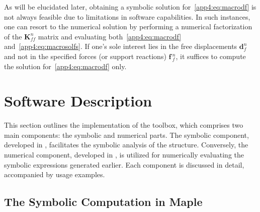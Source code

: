 %
As will be elucidated later, obtaining a symbolic solution for~\eqref{app4:eq:macrodf} is not always feasible due to limitations in software capabilities. In such instances, one can resort to the numerical solution by performing a numerical factorization of the $\mathbf{K}^{n}_{ff}$ matrix and evaluating both~\eqref{app4:eq:macrodf} and~\eqref{app4:eq:macrosolfs}. If one's sole interest lies in the free displacements $\mathbf{d}^{n}_{f}$ and not in the specified forces (or support reactions) $\mathbf{f}{\,}^{n}_{f}$, it suffices to compute the solution for~\eqref{app4:eq:macrodf} only.


\section{Software Description}
\label{app4:sec:software_description}

This section outlines the implementation of the \TrussMe{} toolbox, which comprises two main components: the symbolic and numerical parts. The symbolic component, developed in \Maple{}, facilitates the symbolic analysis of the structure. Conversely, the numerical component, developed in \Matlab{}, is utilized for numerically evaluating the symbolic expressions generated earlier. Each component is discussed in detail, accompanied by usage examples.

\subsection[The Symbolic Computation in \Maple{}]{The Symbolic Computation in Maple}
\label{app4:subsec:symbolic_computation}

